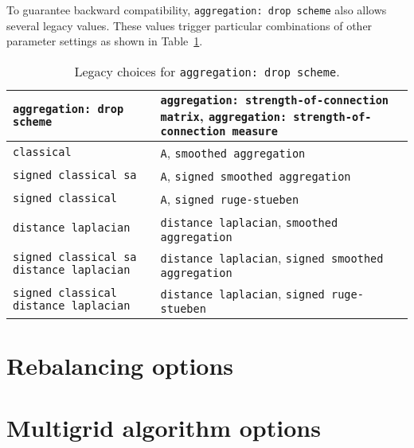 To guarantee backward compatibility, \texttt{aggregation: drop scheme} also allows several legacy values.
These values trigger particular combinations of other parameter settings as shown in Table~\ref{t:old_aggregation_schemes}.

\begin{table}[H]
  \begin{center}
    \begin{tabular}{p{7.0cm} | p{10cm}}
      \texttt{aggregation: drop scheme} & \texttt{aggregation: strength-of-connection matrix}, \texttt{aggregation: strength-of-connection measure}\\
      \toprule
      \texttt{classical} & \texttt{A}, \texttt{smoothed aggregation} \\
      \texttt{signed classical sa} & \texttt{A}, \texttt{signed smoothed aggregation} \\
      \texttt{signed classical} & \texttt{A}, \texttt{signed ruge-stueben} \\
      \texttt{distance laplacian} &  \texttt{distance laplacian}, \texttt{smoothed aggregation} \\
      \texttt{signed classical sa distance laplacian} &  \texttt{distance laplacian}, \texttt{signed smoothed aggregation} \\
      \texttt{signed classical distance laplacian} &  \texttt{distance laplacian}, \texttt{signed ruge-stueben} \\
      \bottomrule
    \end{tabular}
    \caption{Legacy choices for \texttt{aggregation: drop scheme}.}
\label{t:old_aggregation_schemes}
  \end{center}
\end{table}

\section{Rebalancing options}
\label{sec:options_rebalancing}



\section{Multigrid algorithm options}
\label{sec:options_mg}

